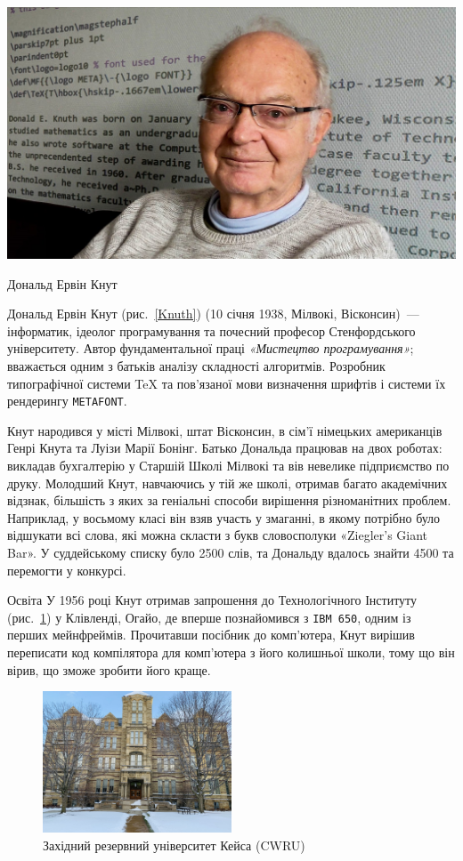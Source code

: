 \documentclass{article}
\begin{document}
	
	
\begin{wrapstuff}[type=figure, l, top=4, width=0.42\linewidth]
	\centering
	\includegraphics[width=\textwidth]{Knuth}
	\captionsetup{justification=centering}
	\caption{Дональд Ервін Кнут}
	\label{Knuth}
\end{wrapstuff}
Дональд Ервін Кнут (рис.~\ref{Knuth}) (10 січня 1938, Мілвокі, Вісконсин)~--- інформатик, ідеолог програмування та почесний професор Стенфордського університету. Автор фундаментальної праці \textit{«Мистецтво програмування»}; вважається одним з батьків аналізу складності алгоритмів. Розробник типографічної системи \TeX{}  та пов'язаної мови визначення шрифтів і системи їх рендерингу \texttt{METAFONT}.
	
	
Кнут народився у місті Мілвокі, штат Вісконсин, в сім'ї німецьких американців Генрі Кнута та Луізи Марії Бонінг. Батько Дональда працював на двох роботах: викладав бухгалтерію у Старшій Школі Мілвокі та вів невелике підприємство по друку. Молодший Кнут, навчаючись у тій же школі, отримав багато академічних відзнак, більшість з яких за геніальні способи вирішення різноманітних проблем. Наприклад, у восьмому класі він взяв участь у змаганні, в якому потрібно було відшукати всі слова, які можна скласти з букв словосполуки «Ziegler's Giant Bar». У суддейському списку було 2500 слів, та Дональду вдалось знайти 4500 та перемогти у конкурсі.
	
Освіта У 1956 році Кнут отримав запрошення до Технологічного Інституту (рис.~\ref{CWRU}) у Клівленді, Огайо, де вперше познайомився з \texttt{IBM 650}, одним із перших мейнфреймів. Прочитавши посібник до комп'ютера, Кнут вирішив переписати код компілятора для комп'ютера з його колишньої школи, тому що він вірив, що зможе зробити його краще.

\begin{figure}
	\centering
	\includegraphics[width=0.5\textwidth]{CWRU}
	\caption{Західний резервний університет Кейса (CWRU)}
	\label{CWRU}
\end{figure}
	
\end{document}
